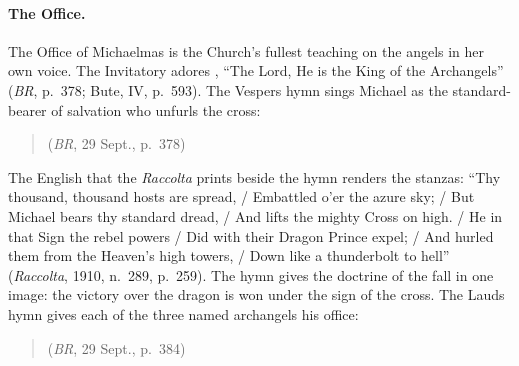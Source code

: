 \paragraph{The Office.} The Office of Michaelmas is the Church's fullest
teaching on the angels in her own voice. The Invitatory adores
, ``The Lord, He is the King of the
Archangels'' (\emph{BR}, p.~378; Bute, IV, p.~593). The Vespers hymn
sings Michael as the standard-bearer of salvation who unfurls the cross:
\begin{quote}
 (\emph{BR}, 29 Sept., p.~378)
\end{quote}
The English that the \emph{Raccolta} prints beside the hymn renders the
stanzas: ``Thy thousand, thousand hosts are spread, / Embattled o'er the
azure sky; / But Michael bears thy standard dread, / And lifts the mighty
Cross on high. / He in that Sign the rebel powers /
Did with their Dragon Prince expel; / And hurled them from the Heaven's
high towers, / Down like a thunderbolt to hell'' (\emph{Raccolta}, 1910,
n.~289, p.~259). The hymn gives the doctrine of the fall in one image:
the victory over the dragon is won under the sign of the cross. The
Lauds hymn  gives each of the
three named archangels his office:
\begin{quote}
 (\emph{BR}, 29 Sept., p.~384)
\end{quote}
